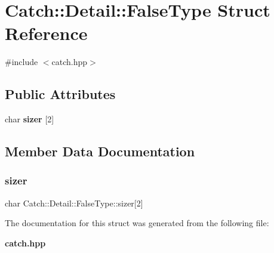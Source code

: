 \section{Catch\+:\+:Detail\+:\+:False\+Type Struct Reference}
\label{struct_catch_1_1_detail_1_1_false_type}


{\ttfamily \#include $<$catch.\+hpp$>$}

\subsection*{Public Attributes}
\begin{DoxyCompactItemize}
\item 
char \textbf{ sizer} [2]
\end{DoxyCompactItemize}


\subsection{Member Data Documentation}
\mbox{\label{struct_catch_1_1_detail_1_1_false_type_abc1a730e197d6f7750ae8aaf47b63477}} 
\subsubsection{sizer}
{\footnotesize\ttfamily char Catch\+::\+Detail\+::\+False\+Type\+::sizer[2]}



The documentation for this struct was generated from the following file\+:\begin{DoxyCompactItemize}
\item 
\textbf{ catch.\+hpp}\end{DoxyCompactItemize}
